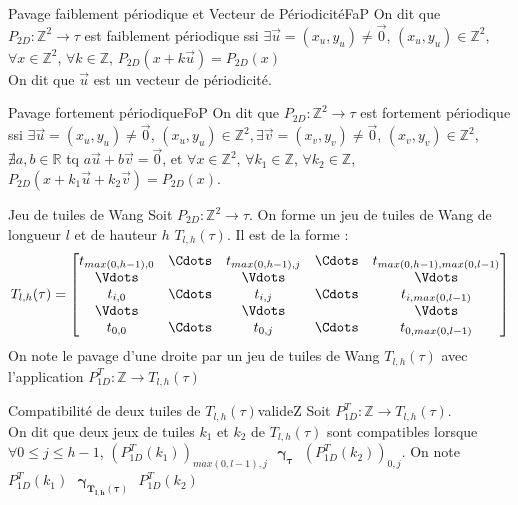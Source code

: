 \documentclass[a4paper,10pt,oneside]{article} %
\begin{document}
\begin{Definition}{Pavage faiblement périodique et Vecteur de Périodicité}{FaP}
On dit que $P_{2D} : \mathds{Z}^2 \rightarrow \tau$ est faiblement périodique ssi $\exists \Vec{u} = (x_u, y_u) \neq \Vec{0}$, $(x_u, y_u) \in \mathds{Z}^2$, $\forall x \in \mathds{Z}^2$, $\forall k \in \mathds{Z}$, {$P_{2D}(x+k\Vec{u}) = P_{2D}(x)$}\\
On dit que $\Vec{u}$ est un vecteur de périodicité.
\end{Definition}

\begin{Definition}{Pavage fortement périodique}{FoP}
On dit que $P_{2D} : \mathds{Z}^2 \rightarrow \tau$ est fortement périodique ssi $\exists \Vec{u} = (x_u, y_u) \neq \Vec{0}$, $(x_u, y_u) \in \mathds{Z}^2, \exists \Vec{v} = (x_v, y_v) \neq \Vec{0}$, $(x_v, y_v) \in \mathds{Z}^2$, $\nexists a, b \in \mathds{R}$ tq $a\Vec{u} + b\Vec{v} = \Vec{0}$, et $\forall x \in \mathds{Z}^2$, $\forall k_1 \in \mathds{Z}$, $\forall k_2 \in \mathds{Z}$, $P_{2D}(x+k_1\Vec{u}+k_2\Vec{v}) = P_{2D}(x)$.
\end{Definition}


\begin{Definition}{Jeu de tuiles de Wang}{}
Soit $P_{2D} : \mathds{Z}^2 \rightarrow \tau$. On forme un jeu de tuiles de Wang de longueur $l$ et de hauteur $h$ $T_{l, h}(\tau)$. Il est de la forme : 
$$
T_{l, h}(\tau) = 
\begin{bmatrix}
t_{max(0,h-1),0} & \Cdots & t_{max(0,h-1),j} & \Cdots & t_{max(0,h-1),max(0,l-1)}\\
\Vdots &  & \Vdots &  & \Vdots\\
t_{i, 0} & \Cdots & t_{i,j} & \Cdots & t_{i,max(0,l-1)}\\
\Vdots &  & \Vdots &  & \Vdots\\
t_{0,0} & \Cdots & t_{0,j} & \Cdots & t_{0,max(0,l-1)}
\end{bmatrix}
$$
On note le pavage d'une droite par un jeu de tuiles de Wang $T_{l, h}(\tau)$ avec l'application $P_{1D}^T : \mathds{Z} \rightarrow T_{l, h}(\tau)$
\end{Definition}

\begin{Definition}{Compatibilité de deux tuiles de $T_{l,h}(\tau)$}{valideZ}
Soit $P_{1D}^T : \mathds{Z} \rightarrow T_{l, h}(\tau)$. \\
On dit que deux jeux de tuiles $k_1$ et $k_2$ de $T_{l, h}(\tau)$ sont compatibles lorsque $\forall 0 \leq j \leq h-1$, $(P_{1D}^T(k_1))_{max(0,l-1), j} \text{ } \bm{\gamma_{\tau}} \text{ } (P_{1D}^T(k_2))_{0, j}$. On note $ P_{1D}^T(k_1) \text{ } \bm{\gamma_{T_{l, h}(\tau)}} \text{ } P_{1D}^T(k_2)$
\end{Definition}
\end{document}
